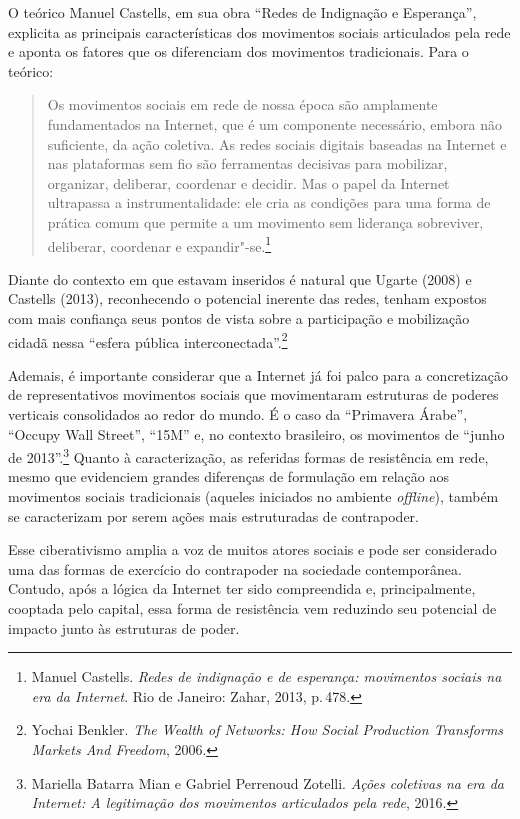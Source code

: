 O teórico Manuel Castells, em sua obra ``Redes de Indignação e
Esperança'', explicita as principais características dos movimentos
sociais articulados pela rede e aponta os fatores que os diferenciam dos
movimentos tradicionais. Para o teórico:

\begin{quote}
Os movimentos sociais em rede de nossa época são amplamente
fundamentados na Internet, que é um componente necessário, embora não
suficiente, da ação coletiva. As redes sociais digitais baseadas na
Internet e nas plataformas sem fio são ferramentas decisivas para
mobilizar, organizar, deliberar, coordenar e decidir. Mas o papel da
Internet ultrapassa a instrumentalidade: ele cria as condições para uma
forma de prática comum que permite a um movimento sem liderança
sobreviver, deliberar, coordenar e expandir"-se.\footnote{Manuel Castells. \textit{Redes de indignação e de esperança: movimentos sociais na era da Internet}. Rio de Janeiro: Zahar, 2013, p.\,478.}
\end{quote}

Diante do contexto em que estavam inseridos é natural que Ugarte (2008)
e Castells (2013), reconhecendo o potencial inerente das redes, tenham
expostos com mais confiança seus pontos de vista sobre a participação e
mobilização cidadã nessa ``esfera pública interconectada''.\footnote{Yochai Benkler. \textit{The Wealth of Networks: How Social Production Transforms Markets And Freedom}, 2006.}

Ademais, é importante considerar que a Internet já foi palco para a
concretização de representativos movimentos sociais que movimentaram
estruturas de poderes verticais consolidados ao redor do mundo. É o caso
da ``Primavera Árabe'', ``Occupy Wall Street'', ``15M'' e, no contexto
brasileiro, os movimentos de ``junho de 2013''.\footnote{Mariella Batarra Mian e  Gabriel Perrenoud Zotelli. \textit{Ações coletivas na era da Internet: A legitimação dos movimentos articulados pela rede}, 2016.}
Quanto à caracterização, as referidas formas de resistência em rede,
mesmo que evidenciem grandes diferenças de formulação em relação aos
movimentos sociais tradicionais (aqueles iniciados no ambiente
\textit{offline}), também se caracterizam por serem ações mais estruturadas de
contrapoder.

Esse ciberativismo amplia a voz de muitos atores sociais e pode ser
considerado uma das formas de exercício do contrapoder na sociedade
contemporânea. Contudo, após a lógica da Internet ter sido compreendida
e, principalmente, cooptada pelo capital, essa forma de resistência vem
reduzindo seu potencial de impacto junto às estruturas de poder.

